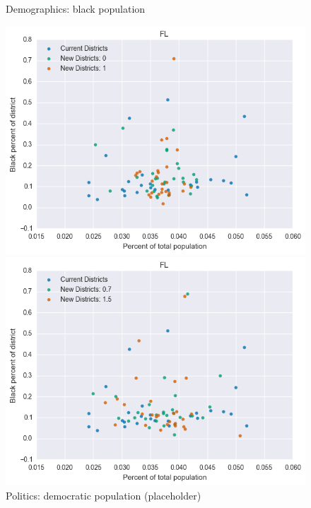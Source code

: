 \begin{figure}[htb!] \centering
\caption{ Demographics: black population }
\includegraphics[width=4.5in]{../analysis/FL/analysis_scatter.png}
\caption{ Politics: democratic population (placeholder)}
\includegraphics[width=4.5in]{../analysis/FL/analysis_scatter2.png}
\end{figure}

\clearpage
\newpage

